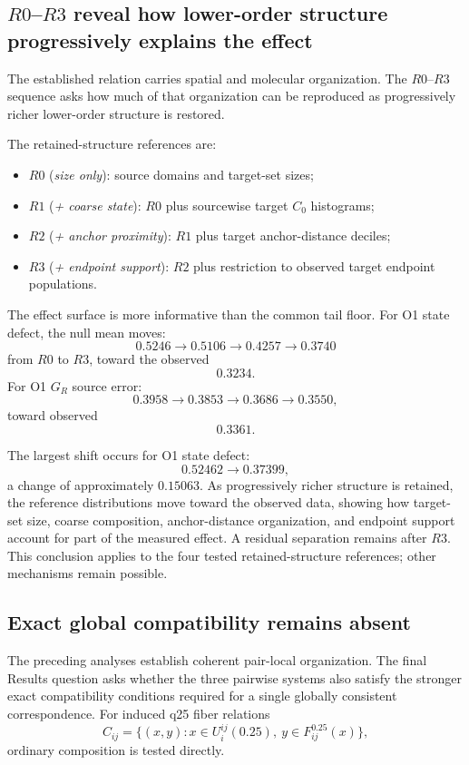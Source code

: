 \documentclass[11pt]{article}
\begin{document}
\subsection{\(R0\)--\(R3\) reveal how lower-order structure progressively explains the effect}

The established relation carries spatial and molecular organization. The \(R0\)--\(R3\) sequence asks how much of that organization can be reproduced as progressively richer lower-order structure is restored.

The retained-structure references are:
\begin{itemize}[leftmargin=2em]
\item \(R0\) (\emph{size only}): source domains and target-set sizes;
\item \(R1\) (\emph{+ coarse state}): \(R0\) plus sourcewise target \(C_0\) histograms;
\item \(R2\) (\emph{+ anchor proximity}): \(R1\) plus target anchor-distance deciles;
\item \(R3\) (\emph{+ endpoint support}): \(R2\) plus restriction to observed target endpoint populations.
\end{itemize}


The effect surface is more informative than the common tail floor. For O1 state defect, the null mean moves:
\[
0.5246\rightarrow0.5106\rightarrow0.4257\rightarrow0.3740
\]
from \(R0\) to \(R3\), toward the observed
\[
0.3234.
\]
For O1 \(G_R\) source error:
\[
0.3958\rightarrow0.3853\rightarrow0.3686\rightarrow0.3550,
\]
toward observed
\[
0.3361.
\]

The largest shift occurs for O1 state defect:
\[
0.52462\rightarrow0.37399,
\]
a change of approximately \(0.15063\). As progressively richer structure is retained, the reference distributions move toward the observed data, showing how target-set size, coarse composition, anchor-distance organization, and endpoint support account for part of the measured effect. A residual separation remains after \(R3\). This conclusion applies to the four tested retained-structure references; other mechanisms remain possible.

\subsection{Exact global compatibility remains absent}

The preceding analyses establish coherent pair-local organization. The final Results question asks whether the three pairwise systems also satisfy the stronger exact compatibility conditions required for a single globally consistent correspondence. For induced q25 fiber relations
\[
C_{ij}
=
\{(x,y):x\in U_i^{ij}(0.25),\ y\in F_{ij}^{0.25}(x)\},
\]
ordinary composition is tested directly.
\end{document}
